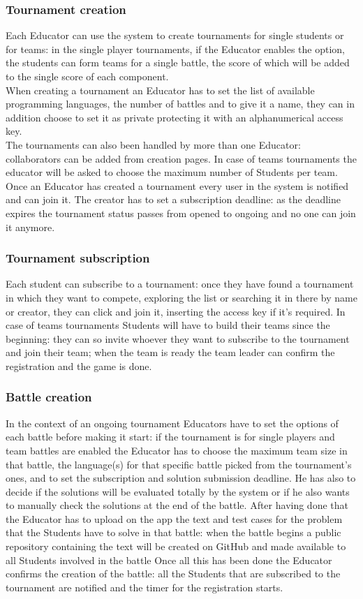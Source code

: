 \documentclass{article}
\begin{document}
\subsubsection{Tournament creation}
Each Educator can use the system to create tournaments for single students or for teams: in the single player tournaments, if the Educator enables the option, the students can form teams for a single battle, the score of which will be added to the single score of each component.\\
When creating a tournament an Educator has to set the list of available programming languages, the number of battles and to give it a name, they can in addition choose to set it as private protecting it with an alphanumerical access key.\\
The tournaments can also been handled by more than one Educator: collaborators can be added from creation pages.
In case of teams tournaments the educator will be asked to choose the maximum number of Students per team.
Once an Educator has created a tournament every user in the system is notified and can join it.
The creator has to set a subscription deadline: as the deadline expires the tournament status passes from opened to ongoing and no one can join it anymore.
\subsubsection{Tournament subscription}
Each student can subscribe to a tournament: once they have found a tournament in which they want to compete, exploring the list or searching it in there by name or creator, they can click and join it, inserting the access key if it's required. 
In case of teams tournaments Students will have to build their teams since the beginning: they can so invite whoever they want to subscribe to the tournament and join their team; when the team is ready the team leader can confirm the registration and the game is done.
\subsubsection{Battle creation}
In the context of an ongoing tournament Educators have to set the options of each battle before making it start: if the tournament is for single players and team battles are enabled the Educator has to choose the maximum team size in that battle, the language(s) for that specific battle picked from the tournament's ones, and to set the subscription and solution submission deadline.
He has also to decide if the solutions will be evaluated totally by the system or if he also wants to manually check the solutions at the end of the battle.
After having done that the Educator has to upload on the app the text and test cases for the problem that the Students have to solve in that battle: when the battle begins a public repository containing the text will be created on GitHub and made available to all Students involved in the battle
Once all this has been done the Educator confirms the creation of the battle: all the Students that are subscribed to the tournament are notified and the timer for the registration starts.
\end{document}
